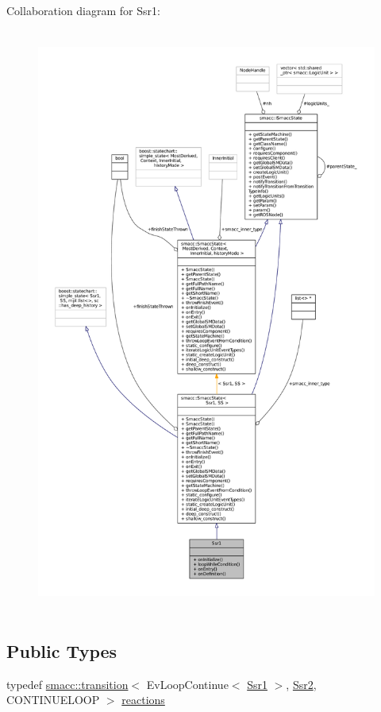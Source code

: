Collaboration diagram for Ssr1\+:
\nopagebreak
\begin{figure}[H]
\begin{center}
\leavevmode
\includegraphics[height=550pt]{structSsr1__coll__graph}
\end{center}
\end{figure}
\subsection*{Public Types}
\begin{DoxyCompactItemize}
\item 
typedef \hyperlink{classsmacc_1_1transition}{smacc\+::transition}$<$ Ev\+Loop\+Continue$<$ \hyperlink{structSsr1}{Ssr1} $>$, \hyperlink{structSsr2}{Ssr2}, C\+O\+N\+T\+I\+N\+U\+E\+L\+O\+OP $>$ \hyperlink{structSsr1_a111c7f967fc4bfa3c4bc59453707ecf0}{reactions}
\end{DoxyCompactItemize}
